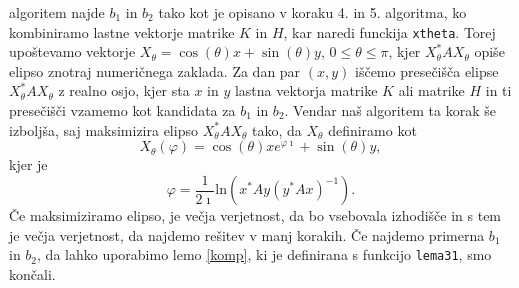 \documentclass[12pt,a4paper]{amsart}\usepackage[slovene]{babel}%
\theoremstyle{definition}\newtheorem{definicija}{Definicija}[section]\newtheorem{primer}[definicija]{Primer}\newtheorem{opomba}[definicija]{Opomba}
\theoremstyle{plain}\newtheorem{lema}[definicija]{Lema}\newtheorem{izrek}[definicija]{Izrek}\newtheorem{trditev}[definicija]{Trditev}\newtheorem{posledica}[definicija]{Posledica}
\begin{document}
{algoritem najde $b_1$ in $b_2$ tako kot je opisano v koraku 4. in 5. algoritma, ko kombiniramo lastne vektorje matrike $K$ in $H$, kar naredi funckija \verb+xtheta+. Torej upoštevamo vektorje $X_\theta =\cos(\theta)x+\sin(\theta)y$, $0\le\theta\le\pi$, kjer $X_\theta ^\ast AX_\theta$ opiše elipso znotraj numeričnega zaklada. Za dan par $(x,y)$ iščemo presečišča elipse $X_\theta ^\ast AX_\theta$ z realno osjo, kjer sta $x$ in $y$ lastna vektorja matrike $K$ ali matrike $H$ in ti presečišči vzamemo kot kandidata za $b_1$ in $b_2$. Vendar naš algoritem ta korak še izboljša, saj maksimizira elipso $X_\theta ^\ast AX_\theta$ tako, da $X_\theta$ definiramo kot $$X_\theta (\varphi) =\cos(\theta)x e^{\varphi \imath}+\sin(\theta)y,$$ kjer je $$\varphi = \frac{1}{2\imath} \text{ln}(x^\ast Ay (y^\ast Ax)^{-1}).$$ Če maksimiziramo elipso, je večja verjetnost, da bo vsebovala izhodišče in s tem je večja verjetnost, da najdemo rešitev v manj korakih. Če najdemo primerna $b_1$ in $b_2$, da lahko uporabimo lemo \ref{komp}, ki je definirana s funkcijo \verb+lema31+, smo končali.%
}
\end{document}
